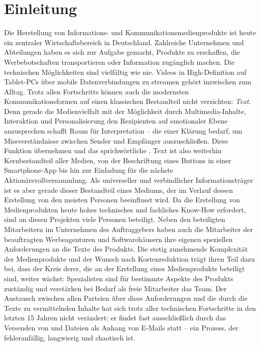 \section{Einleitung}

Die Herstellung von Informations- und Kommunikationsmedienprodukte ist heute ein zentraler Wirtschaftsbereich in Deutschland. Zahlreiche Unternehmen und Abteilungen haben es sich zur Aufgabe gemacht, Produkte zu erschaffen, die Werbebotschaften transportieren oder Information zugänglich machen. Die technischen Möglichkeiten sind vielfältig wie nie. Videos in High-Definition auf Tablet-PCs über mobile Datenverbindungen zu streamen gehört inzwischen zum Alltag. Trotz allen Fortschritts können auch die modernsten Kommunikationsformen auf einen klassischen Bestandteil nicht verzichten: \emph{Text}. Denn gerade die Medienvielfalt mit der Möglichkeit durch Multimedia-Inhalte, Interaktion und Personalisierung den Rezipienten auf emotionaler Ebene anzusprechen schafft Raum für Interpretation -- die einer Klärung bedarf, um Missverständnisse zwischen Sender und Empfänger auszuschließen. Diese Funktion übernehmen  und das sprichwörtliche . Text ist also weiterhin Kernbestandteil aller Medien, von der Beschriftung eines Buttons in einer Smartphone-App bis hin zur Einladung für die nächste Aktionärsvollversammlung. Als universeller und verbindlicher Informationsträger ist es aber gerade dieser Bestandteil eines Mediums, der im Verlauf dessen Erstellung von den meisten Personen beeinflusst wird. Da die Erstellung von Medienprodukten heute hohes technisches und fachliches Know-How erfordert, sind an diesen Projekten viele Personen beteiligt. Neben den beteiligten Mitarbeitern im Unternehmen des Auftraggebers haben auch die Mitarbeiter der beauftragten Werbeagenturen und Softwarehäusern ihre eigenen speziellen Anforderungen an die Texte des Produkts. Die stetig zunehmende Komplexität der Medienprodukte und der Wunsch nach Kostenreduktion trägt ihren Teil dazu bei, dass der Kreis derer, die an der Erstellung eines Medienprodukts beteiligt sind, weiter wächst: Spezialisten sind für bestimmte Aspekte des Produkts zuständig und verstärken bei Bedarf als freie Mitarbeiter das Team. Der Austausch zwischen allen Parteien über diese Anforderungen und die durch die Texte zu vermittelnden Inhalte hat sich trotz aller technischen Fortschritte in den letzten 15 Jahren nicht verändert: er findet fast ausschließlich durch das Versenden von  und Dateien als Anhang von E-Mails statt -- ein Prozess, der fehleranfällig, langwierig und chaotisch ist. 

